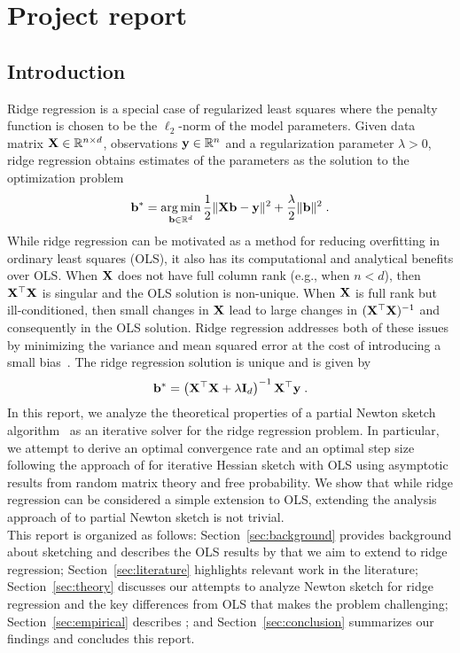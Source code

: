 

\section{Project report}

\subsection{Introduction}

Ridge regression is a special case of regularized least squares where the penalty function is chosen to be the $\ell_2$-norm of the model parameters. Given data matrix $\mathbf{X}\in\mathbb{R}^{n\times d}$, observations $\mathbf{y}\in\mathbb{R}^n$ and a regularization parameter $\lambda>0$, ridge regression obtains estimates of the parameters as the solution to the optimization problem
\[
\mathbf{b}^* = \operatorname*{arg\,min}_{\mathbf{b}\in\mathbb{R}^d} \frac{1}{2}\|\mathbf{X}\mathbf{b}-\mathbf{y}\|^2 + \frac{\lambda}{2}\|\mathbf{b}\|^2 \;.
\]
While ridge regression can be motivated as a method for reducing overfitting in ordinary least squares (OLS), it also has its computational and analytical benefits over OLS. When $\mathbf{X}$ does not have full column rank (e.g., when $n< d$), then $\mathbf{X}^\top\mathbf{X}$ is singular and the OLS solution is non-unique. When $\mathbf{X}$ is full rank but ill-conditioned, then small changes in $\mathbf{X}$ lead to large changes in $(\mathbf{X}^\top\mathbf{X})^{-1}$ and consequently in the OLS solution. Ridge regression addresses both of these issues by minimizing the variance and mean squared error at the cost of introducing a small bias~\citep{Chowdhury:2018}. The ridge regression solution is unique and is given by
\[
\mathbf{b}^* = \left(\mathbf{X}^\top\mathbf{X} + \lambda\mathbf{I}_d\right)^{-1}\mathbf{X}^\top\mathbf{y} \;.
\]
In this report, we analyze the theoretical properties of a partial Newton sketch algorithm~\citep{Pilanci:2017} as an iterative solver for the ridge regression problem. In particular, we attempt to derive an optimal convergence rate and an optimal step size following the approach of \citet{Lacotte:2020} for iterative Hessian sketch with OLS using asymptotic results from random matrix theory and free probability. We show that while ridge regression can be considered a simple extension to OLS, extending the analysis approach of \citet{Lacotte:2020} to partial Newton sketch is not trivial. \todo
\\

This report is organized as follows: Section~\ref{sec:background} provides background about sketching and describes the OLS results by \citet{Lacotte:2020} that we aim to extend to ridge regression; Section~\ref{sec:literature} highlights relevant work in the literature; Section~\ref{sec:theory} discusses our attempts to analyze Newton sketch for ridge regression and the key differences from OLS that makes the problem challenging; Section~\ref{sec:empirical} describes \todo; and Section~\ref{sec:conclusion} summarizes our findings and concludes this report.

